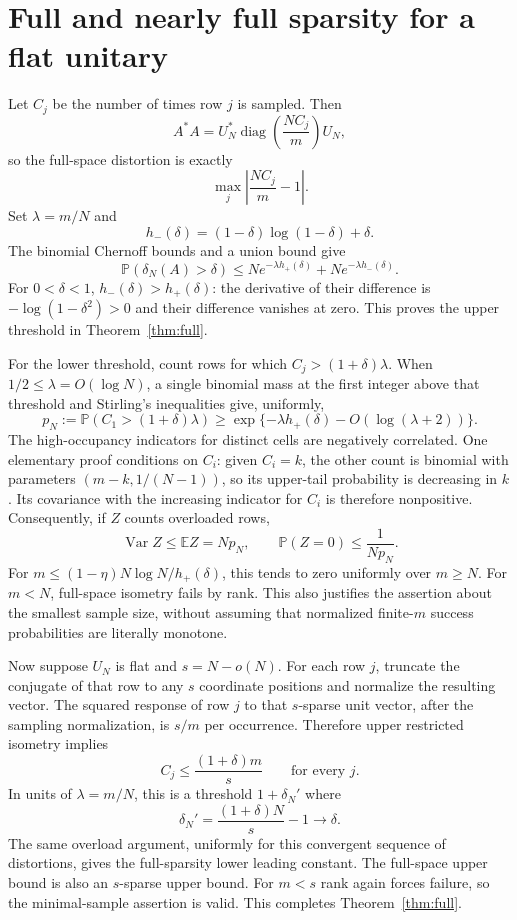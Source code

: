 \documentclass[11pt]{article}
\theoremstyle{remark}\newtheorem{remark}[theorem]{Remark}
\newcommand{\E}{\mathbb E}\newcommand{\Prob}{\mathbb P}
\newcommand{\Var}{\operatorname{Var}}\newcommand{\KL}{\operatorname{D}}
\begin{document}
\section{Full and nearly full sparsity for a flat unitary}
Let $C_j$ be the number of times row $j$ is sampled. Then
\[
 A^*A=U_N^*\operatorname{diag}\left(\frac{NC_j}{m}\right)U_N,
\]
so the full-space distortion is exactly
\[
 \max_j\left|\frac{NC_j}{m}-1\right|.
\]
Set $\lambda=m/N$ and
\[
 h_-(\delta)=(1-\delta)\log(1-\delta)+\delta.
\]
The binomial Chernoff bounds and a union bound give
\[
 \Prob(\delta_N(A)>\delta)\le
 N e^{-\lambda h_+(\delta)}+N e^{-\lambda h_-(\delta)}.
\]
For $0<\delta<1$, $h_-(\delta)>h_+(\delta)$: the derivative of their difference is $-\log(1-\delta^2)>0$ and their difference vanishes at zero. This proves the upper threshold in Theorem~\ref{thm:full}.

For the lower threshold, count rows for which $C_j>(1+\delta)\lambda$. When $1/2\le\lambda=O(\log N)$, a single binomial mass at the first integer above that threshold and Stirling's inequalities give, uniformly,
\[
 p_N:=\Prob(C_1>(1+\delta)\lambda)
 \ge\exp\{-\lambda h_+(\delta)-O(\log(\lambda+2))\}.
\]
The high-occupancy indicators for distinct cells are negatively correlated. One elementary proof conditions on $C_i$: given $C_i=k$, the other count is binomial with parameters $(m-k,1/(N-1))$, so its upper-tail probability is decreasing in $k$. Its covariance with the increasing indicator for $C_i$ is therefore nonpositive. Consequently, if $Z$ counts overloaded rows,
\[
 \Var Z\le\E Z=Np_N,\qquad
 \Prob(Z=0)\le\frac1{Np_N}.
\]
For $m\le(1-\eta)N\log N/h_+(\delta)$, this tends to zero uniformly over $m\ge N$. For $m<N$, full-space isometry fails by rank. This also justifies the assertion about the smallest sample size, without assuming that normalized finite-$m$ success probabilities are literally monotone.

Now suppose $U_N$ is flat and $s=N-o(N)$. For each row $j$, truncate the conjugate of that row to any $s$ coordinate positions and normalize the resulting vector. The squared response of row $j$ to that $s$-sparse unit vector, after the sampling normalization, is $s/m$ per occurrence. Therefore upper restricted isometry implies
\[
 C_j\le\frac{(1+\delta)m}{s}\qquad\text{for every }j.
\]
In units of $\lambda=m/N$, this is a threshold $1+\delta_N'$ where
\[
 \delta_N'=\frac{(1+\delta)N}{s}-1\longrightarrow\delta.
\]
The same overload argument, uniformly for this convergent sequence of distortions, gives the full-sparsity lower leading constant. The full-space upper bound is also an $s$-sparse upper bound. For $m<s$ rank again forces failure, so the minimal-sample assertion is valid. This completes Theorem~\ref{thm:full}.
\end{document}
